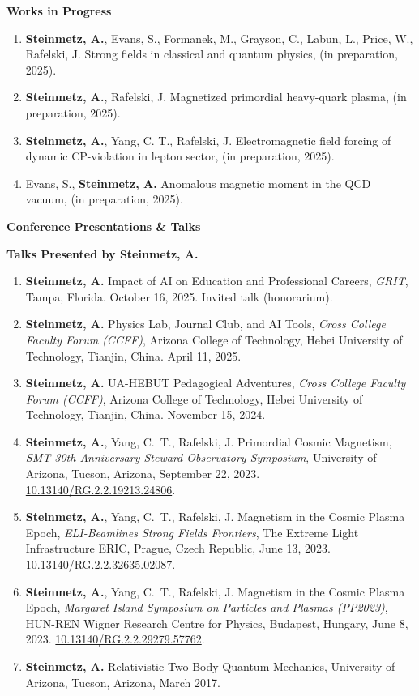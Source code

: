 \documentclass[11pt]{article}
\begin{document}
\medskip

{\large\textbf{Works in Progress}}

\begin{enumerate}[leftmargin=*,nosep]
    \item \textbf{Steinmetz, A.}, Evans, S., Formanek, M., Grayson, C., Labun, L., Price, W., Rafelski, J. Strong fields in classical and quantum physics, (in preparation, 2025).
    \item \textbf{Steinmetz, A.}, Rafelski, J. Magnetized primordial heavy-quark plasma, (in preparation, 2025).
    \item \textbf{Steinmetz, A.}, Yang, C. T., Rafelski, J. Electromagnetic field forcing of dynamic CP-violation in lepton sector, (in preparation, 2025).
    \item Evans, S., \textbf{Steinmetz, A.} Anomalous magnetic moment in the QCD vacuum, (in preparation, 2025).
\end{enumerate}

\medskip

{\Large\textbf{Conference Presentations \& Talks}}

{\large\textbf{Talks Presented by Steinmetz, A.}}

\begin{enumerate}[leftmargin=*,nosep]
    \item \textbf{Steinmetz, A.} Impact of AI on Education and Professional Careers, \textit{GRIT}, Tampa, Florida. October 16, 2025. Invited talk (honorarium).
    \item \textbf{Steinmetz, A.} Physics Lab, Journal Club, and AI Tools, \textit{Cross College Faculty Forum (CCFF)}, Arizona College of Technology, Hebei University of Technology, Tianjin, China. April 11, 2025.
    \item \textbf{Steinmetz, A.} UA-HEBUT Pedagogical Adventures, \textit{Cross College Faculty Forum (CCFF)}, Arizona College of Technology, Hebei University of Technology, Tianjin, China. November 15, 2024.
    \item \textbf{Steinmetz, A.}, Yang, C.~T., Rafelski, J. Primordial Cosmic Magnetism, \textit{SMT 30th Anniversary Steward Observatory Symposium}, University of Arizona, Tucson, Arizona, September 22, 2023.\\ \href{http://dx.doi.org/10.13140/RG.2.2.19213.24806}{10.13140/RG.2.2.19213.24806}.
    \item \textbf{Steinmetz, A.}, Yang, C.~T., Rafelski, J. Magnetism in the Cosmic Plasma Epoch, \textit{ELI-Beamlines Strong Fields Frontiers}, The Extreme Light Infrastructure ERIC, Prague, Czech Republic, June 13, 2023. \href{http://dx.doi.org/10.13140/RG.2.2.32635.02087}{10.13140/RG.2.2.32635.02087}.
    \item \textbf{Steinmetz, A.}, Yang, C.~T., Rafelski, J. Magnetism in the Cosmic Plasma Epoch, \textit{Margaret Island Symposium on Particles and Plasmas (PP2023)}, HUN-REN Wigner Research Centre for Physics, Budapest, Hungary, June 8, 2023. \href{http://dx.doi.org/10.13140/RG.2.2.29279.57762}{10.13140/RG.2.2.29279.57762}.
    \item \textbf{Steinmetz, A.} Relativistic Two-Body Quantum Mechanics, University of Arizona, Tucson, Arizona, March 2017.
\end{enumerate}
\end{document}
